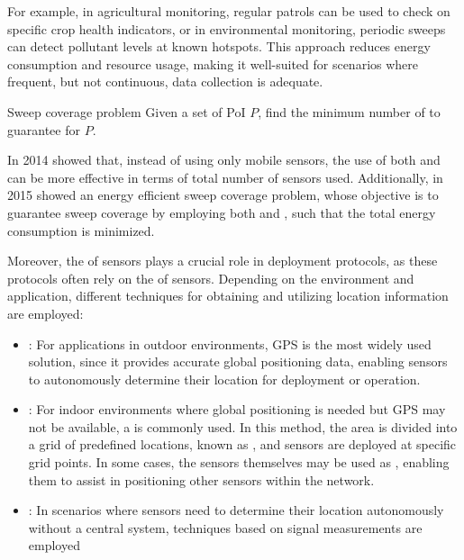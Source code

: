 \documentclass[a4paper, 12pt]{report}
\begin{document}
    For example, in agricultural monitoring, regular patrols can be used to check on specific crop health indicators, or in environmental monitoring, periodic sweeps can detect pollutant levels at known hotspots. This approach reduces energy consumption and resource usage, making it well-suited for scenarios where frequent, but not continuous, data collection is adequate.

    \begin{frameddefn}{Sweep coverage problem}
        Given a set of PoI $P$, find the minimum number of  to guarantee  for $P$.
    \end{frameddefn}

    In 2014 \textcite{gorain14} showed that, instead of using only mobile sensors, the use of both  and  can be more effective in terms of total number of sensors used. Additionally, in 2015 \textcite{gorain15} showed an energy efficient sweep coverage problem, whose objective is to guarantee sweep coverage by employing both  and , such that the total energy consumption is minimized.

    Moreover, the  of sensors plays a crucial role in deployment protocols, as these protocols often rely on the  of sensors. Depending on the environment and application, different techniques for obtaining and utilizing location information are employed:

    \begin{itemize}
        \item {}: For applications in outdoor environments, GPS is the most widely used solution, since it provides accurate global positioning data, enabling sensors to autonomously determine their location for deployment or operation.
        \item {}: For indoor environments where global positioning is needed but GPS may not be available, a  is commonly used. In this method, the area is divided into a grid of predefined locations, known as , and sensors are deployed at specific grid points. In some cases, the sensors themselves may be used as , enabling them to assist in positioning other sensors within the network.
        \item {}: In scenarios where sensors need to determine their location autonomously without a central system, techniques based on signal measurements are employed
    \end{itemize}
\end{document}
